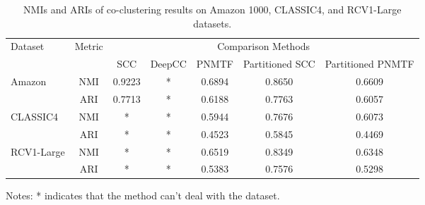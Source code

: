 \begin{table}[htbp]
    \centering
    \caption{NMIs and ARIs of co-clustering results on Amazon 1000, CLASSIC4, and RCV1-Large datasets.}
    \label{tab:evaluation-metrics}
    \begin{tabular}{@{} l c ccccc @{}}
        \toprule
        \multirow{2}{*}{Dataset}    & \multirow{2}{*}{Metric} & \multicolumn{5}{c}{Comparison Methods}                                                         \\
        \cmidrule{3-7}
                                    &                         & SCC                                    & DeepCC & PNMTF  & Partitioned SCC & Partitioned PNMTF \\
        \midrule
        \multirow{2}{*}{Amazon}     & NMI                     & 0.9223                                 & *      & 0.6894 & 0.8650          & 0.6609            \\
                                    & ARI                     & 0.7713                                 & *      & 0.6188 & 0.7763          & 0.6057            \\
        \multirow{2}{*}{CLASSIC4}   & NMI                     & *                                      & *      & 0.5944 & 0.7676          & 0.6073            \\
                                    & ARI                     & *                                      & *      & 0.4523 & 0.5845          & 0.4469            \\
        \multirow{2}{*}{RCV1-Large} & NMI                     & *                                      & *      & 0.6519 & 0.8349          & 0.6348            \\
                                    & ARI                     & *                                      & *      & 0.5383 & 0.7576          & 0.5298            \\
        \bottomrule
    \end{tabular}
    \begin{tablenotes}
        \small
        \item Notes: * indicates that the method can't deal with the dataset.
    \end{tablenotes}
\end{table}